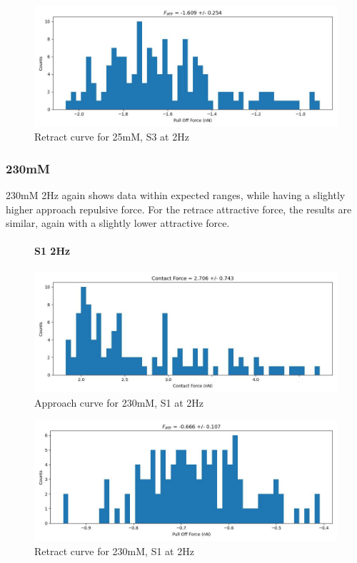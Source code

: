 \begin{figure}[h!]
\centering
\includegraphics[width=\textwidth]{chapter7/Tip speed/25mM/S3 2Hz/retract_f_a_hist.jpg}
\caption{Retract curve for 25mM, S3 at 2Hz}
\end{figure}

\newpage

\subsubsection*{230mM}
230mM 2Hz again shows data within expected ranges, while having a slightly higher approach repulsive force. For the retrace attractive force, the results are similar, again with a slightly lower attractive force.
\begin{figure}[h!]
\paragraph{S1 2Hz}
\centering
\includegraphics[width=\textwidth]{chapter7/Tip speed/230mM/S1 2Hz/approach_f_c_hist.jpg}
\caption{Approach curve for 230mM, S1 at 2Hz}
\end{figure}

\begin{figure}[h!]
\centering
\includegraphics[width=\textwidth]{chapter7/Tip speed/230mM/S1 2Hz/retract_f_a_hist.jpg}
\caption{Retract curve for 230mM, S1 at 2Hz}
\end{figure}


